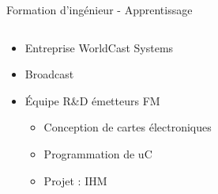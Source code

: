\documentclass[t,compress,mathserif,12pt,xcolor=dvipsnames]{beamer}
\begin{document}
\begin{frame}[t]{Formation d'ingénieur - Apprentissage}
  \begin{minipage}[t][5.0cm][t]{\textwidth}
    \begin{columns}[T]
      \begin{column}{0.63\textwidth}
        \begin{itemize}
          \item<+-> Entreprise WorldCast Systems
          \item<+-> Broadcast
          \item<+-> \'Equipe R\&D émetteurs FM
          \begin{itemize}
            \item<+-> Conception de cartes électroniques
            \item<+-> Programmation de uC
            \item<+-> Projet : IHM
          \end{itemize}
        \end{itemize}
      \end{column}
      \begin{column}{0.04\textwidth}


\end{column}
\end{columns}
\end{minipage}
\end{frame}
\end{document}
